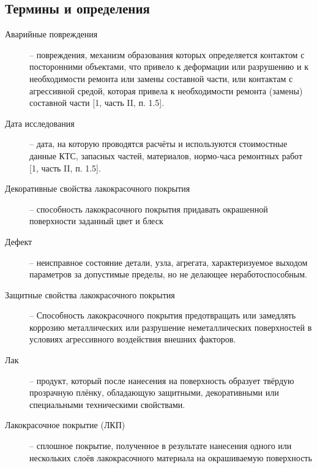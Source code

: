 \subsection{Термины и определения}
\begin{description}
	\item[Аварийные повреждения] -- повреждения, механизм образования которых определяется контактом с посторонними объектами, что привело к деформации или разрушению и к необходимости ремонта или замены составной части, или контактам с агрессивной средой, которая привела к необходимости ремонта (замены) составной части [1, часть II, п. 1.5].
	\item[Дата исследования]-- дата, на которую проводятся расчёты и используются стоимостные данные КТС, запасных частей, материалов, нормо-часа ремонтных работ [1, часть II, п. 1.5].
	\item [Декоративные свойства лакокрасочного покрытия] -- способность лакокрасочного покрытия придавать окрашенной
	поверхности заданный цвет и блеск
	\item[Дефект] -- неисправное состояние детали, узла, агрегата, характеризуемое выходом  параметров за допустимые пределы, но не делающее  неработоспособным. 
	\item [Защитные свойства лакокрасочного покрытия] --
	Способность лакокрасочного покрытия предотвращать или замедлять
	коррозию металлических или разрушение неметаллических поверхностей в
	условиях агрессивного воздействия внешних факторов.
	\item[Лак] -- продукт, который после нанесения на поверхность образует твёрдую прозрачную 	плёнку, обладающую защитными, декоративными или специальными техническими свойствами.
	\item[Лакокрасочное покрытие (ЛКП)] -- сплошное покрытие, полученное в результате нанесения 	одного или нескольких слоёв лакокрасочного материала на окрашиваемую поверхность

\end{description}
